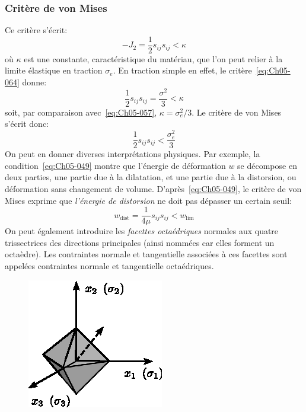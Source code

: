 \subsubsection{Critère de von Mises}
Ce critère s'écrit:
\begin{equation}
    -J_2 = \frac{1}{2} s_{ij} s_{ij} < \kappa
    \label{eq:Ch05-064}
\end{equation}
où $\kappa$ est une constante, caractéristique du matériau, que l'on peut relier à la limite élastique en traction $\sigma_e$.
En traction simple en effet, le critère~\eqref{eq:Ch05-064} donne: 
\begin{equation}
    \frac{1}{2} s_{ij} s_{ij} = \frac{\sigma^2}{3} < \kappa
\end{equation}
soit, par comparaison avec~\eqref{eq:Ch05-057}, $\kappa = \sigma_e^2/3$.
Le critère de von Mises s'écrit donc: 
\begin{equation}
    \frac{1}{2} s_{ij} s_{ij} < \frac{\sigma_e^2}{3}
    \label{eq:Ch05-065}
\end{equation}
On peut en donner diverses interprétations physiques.
Par exemple, la condition~\eqref{eq:Ch05-049} montre que l'énergie de déformation $w$ se décompose en deux parties, une partie due à la dilatation, et une partie due à la distorsion, ou déformation sans changement de volume.
D'après~\eqref{eq:Ch05-049}, le critère de von Mises exprime que \emph{l'énergie de distorsion} ne doit pas dépasser un certain seuil: 
\begin{equation}
    w_{\mathrm{dist}} = \frac{1}{4\mu} s_{ij} s_{ij} < w_{\mathrm{lim}}
    \label{eq:Ch05-065b}
\end{equation}
On peut également introduire les \emph{facettes octaédriques} normales aux quatre trissectrices des directions principales (ainsi nommées car elles forment un octaèdre).
Les contraintes normale et tangentielle associées à ces facettes sont appelées contraintes normale et tangentielle octaédriques.

\begin{figure}
    \begin{center}
        \includegraphics[scale=1.3]{../images/T1_Ch05-04}
    \end{center}
\end{figure}

